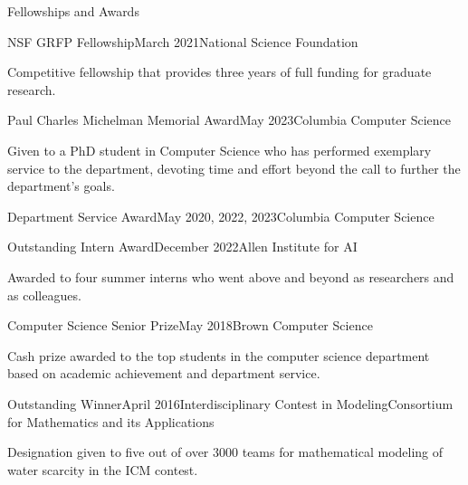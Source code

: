 \documentclass{resume} %
\begin{document}

\begin{rSection}{Fellowships and Awards} \itemsep -2pt

\begin{rSubsection}{NSF GRFP Fellowship}{March 2021}{National Science Foundation}{}
\item Competitive fellowship that provides three years of full funding for graduate research.
\end{rSubsection}

\begin{rSubsection}{Paul Charles Michelman Memorial Award}{May 2023}{Columbia Computer Science}{}
\item Given to a PhD student in Computer Science who has performed exemplary service to the department, devoting time and effort beyond the call to further the department’s goals.
\end{rSubsection}

\begin{rSubsection}{Department Service Award}{May 2020, 2022, 2023}{Columbia Computer Science}{}
\end{rSubsection}

\begin{rSubsection}{Outstanding Intern Award}{December 2022}{Allen Institute for AI}{}
\item Awarded to four summer interns who went above and beyond as researchers and as colleagues.
\end{rSubsection}

\begin{rSubsection}{Computer Science Senior Prize}{May 2018}{Brown Computer Science}{}
\item Cash prize awarded to the top students in the computer science department based on academic achievement and department service.
\end{rSubsection}

\begin{rSubsection}{Outstanding Winner}{April 2016}{Interdisciplinary Contest in Modeling}{Consortium for Mathematics and its Applications}
\item Designation given to five out of over 3000 teams for mathematical modeling of water scarcity in the ICM contest.
\end{rSubsection}

\end{rSection}
\end{document}
